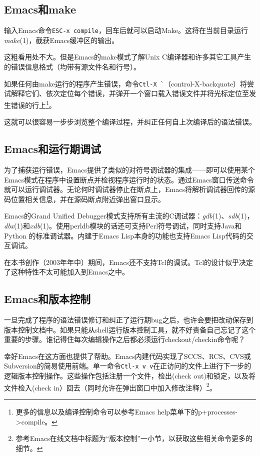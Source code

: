 \documentclass[12pt,oneside]{ctexbook}
\begin{document}
\begin{common-format}
\subsection{Emacs和make}
输入Emacs命令\verb+ESC-x compile+，回车后就可以启动Make。这将在当前目录运行\textit{make}(1)，截获Emacs缓冲区的输出。

这粗看用处不大。但是Emacs的make模式了解Unix C编译器和许多其它工具产生的错误信息格式（均带有源文件名和行号）。

如果任何由make运行的程序产生错误，命令\verb+Ctl-X `+（control-X-backquote）将尝试解释它们、依次定位每个错误，并弹开一个窗口载入错误文件并将光标定位至发生错误的行上\footnote{更多的信息以及编译控制命令可以参考Emacs help菜单下的p+processes->compile。}。

这就可以很容易一步步浏览整个编译过程，并纠正任何自上次编译后的语法错误。

\subsection{Emacs和运行期调试}
为了捕获运行错误，Emacs提供了类似的对符号调试器的集成——即可以使用某个Emacs模式在程序中设置断点并检视程序运行时的状态。通过Emacs窗口传送命令就可以运行调试器。无论何时调试器停止在断点上，Emacs将解析调试器回传的源码位置相关信息，并在源码断点附近弹出窗口显示。

Emacs的Grand Unified Debugger模式支持所有主流的C调试器：\textit{gdb}(1)、\textit{sdb}(1)，\textit{dbx}(1)和\textit{xdb}(1)。使用perldb模块的话还可支持Perl符号调试，同时支持Java和Python
的标准调试器。内建于Emacs Lisp本身的功能也支持Emacs Lisp代码的交互调试。

在本书创作（2003年年中）期间，Emacs还不支持Tcl的调试。Tcl的设计似乎决定了这种特性不太可能加入到Emacs之中。

\subsection{Emacs和版本控制}
一旦完成了程序的语法错误修订和纠正了运行期bug之后，也许会要把改动保存到版本控制文档中。如果只能从shell运行版本控制工具，就不好责备自己忘记了这个重要的步骤。谁记得住每次编辑操作之后都必须运行checkout/checkin命令呢？

幸好Emacs在这方面也提供了帮助。Emacs内建代码实现了SCCS、RCS、CVS或Subversion的简易使用前端。单一命令\verb+Ctl-x v v+在正访问的文件上进行下一步的逻辑版本控制操作。这些操作包括注册一个文件，检出(check out)和锁定，以及将文件检入(check in）回去（同时允许在弹出窗口中加入修改注释）\footnote{参考Emacs在线文档中标题为“版本控制”一小节，以获取这些相关命令更多的细节。}。


\end{common-format}
\end{document}
